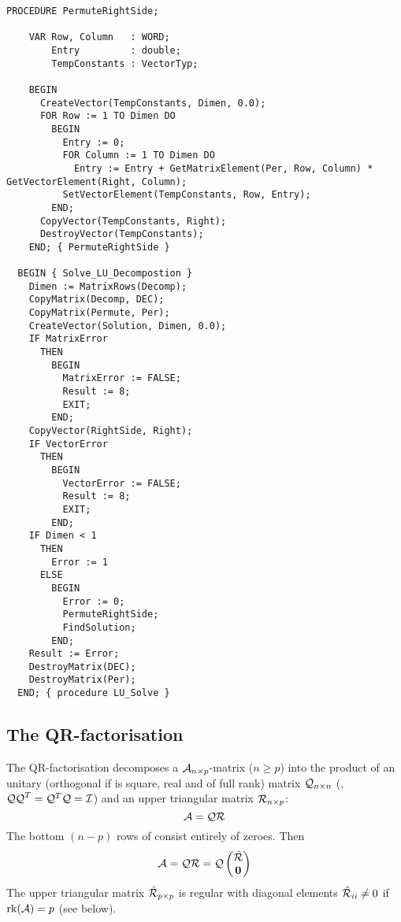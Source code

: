 \begin{lstlisting}[caption=Solve system]
    PROCEDURE PermuteRightSide;

    VAR Row, Column   : WORD;
        Entry         : double;
        TempConstants : VectorTyp;

    BEGIN
      CreateVector(TempConstants, Dimen, 0.0);
      FOR Row := 1 TO Dimen DO
        BEGIN
          Entry := 0;
          FOR Column := 1 TO Dimen DO
            Entry := Entry + GetMatrixElement(Per, Row, Column) * GetVectorElement(Right, Column);
          SetVectorElement(TempConstants, Row, Entry);
        END;
      CopyVector(TempConstants, Right);
      DestroyVector(TempConstants);
    END; { PermuteRightSide }

  BEGIN { Solve_LU_Decompostion }
    Dimen := MatrixRows(Decomp);
    CopyMatrix(Decomp, DEC);
    CopyMatrix(Permute, Per);
    CreateVector(Solution, Dimen, 0.0);
    IF MatrixError
      THEN
        BEGIN
          MatrixError := FALSE;
          Result := 8;
          EXIT;
        END;
    CopyVector(RightSide, Right);
    IF VectorError
      THEN
        BEGIN
          VectorError := FALSE;
          Result := 8;
          EXIT;
        END;
    IF Dimen < 1
      THEN
        Error := 1
      ELSE
        BEGIN
          Error := 0;
          PermuteRightSide;
          FindSolution;
        END;
    Result := Error;
    DestroyMatrix(DEC);
    DestroyMatrix(Per);
  END; { procedure LU_Solve }
\end{lstlisting}


\subsection{The QR-factorisation}

The QR-factorisation decomposes a \(\mathcal{A}_{n\times p} \)-matrix (\( n \geq p \)) into the product of an unitary (orthogonal if  is square, real and of full rank) matrix \(\mathcal{Q}_{n\times n} \) (, \(\mathcal{QQ}^T = \mathcal{Q}^T\mathcal{Q} = \mathcal{I} \)) and an upper triangular matrix \(\mathcal{R}_{n\times p} \):
\begin{equation}
  \mathcal{A} = \mathcal{QR}
\end{equation}
The bottom \((n-p) \) rows of  consist entirely of zeroes. Then
\begin{equation}
  \mathcal{A} = \mathcal{QR} = \mathcal{Q} \begin{pmatrix}
                                  \hat{\mathcal{R}} \\
                                  \mathbf{0}
                               \end{pmatrix}
\end{equation}
The upper triangular matrix \(\hat{\mathcal{R}}_{p\times p} \) is regular with diagonal elements \(\hat{\mathcal{R}}_{ii} \neq 0 \) if \(\mathrm{rk}(\mathcal{A}) = p \) (see below).

